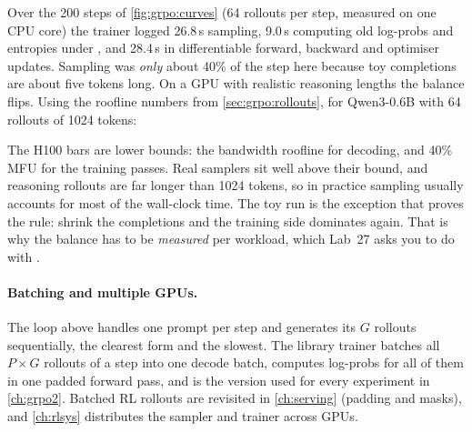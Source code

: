 \begin{systemslens}
Over the 200 steps of \cref{fig:grpo:curves} (64 rollouts per step, measured on one CPU core)
the trainer logged 26.8\,s sampling, 9.0\,s computing old log-probs and entropies under
, and 28.4\,s in differentiable forward, backward and optimiser updates.
Sampling was \emph{only} about 40\% of the step here because toy completions are about five tokens
long. On a GPU with realistic reasoning lengths the balance flips. Using the roofline numbers
from \cref{sec:grpo:rollouts}, for Qwen3-0.6B with 64 rollouts of 1024 tokens:

\smallskip
\centering
{}
\raggedright

\smallskip
The H100 bars are lower bounds: the bandwidth roofline for decoding, and 40\% MFU
for the training passes. Real samplers sit well above their bound, and reasoning
rollouts are far longer than 1024 tokens, so in practice sampling usually accounts for most of
the wall-clock time. The toy run is the exception that proves the rule: shrink the
completions and the training side dominates again. That is why the balance has to be
\emph{measured} per workload, which Lab~27 asks you to do with .
\end{systemslens}

\paragraph{Batching and multiple GPUs.} The loop above handles one prompt per step and
generates its $G$ rollouts sequentially, the clearest form and the slowest. The library trainer
batches all $P\times G$ rollouts of a step into one decode batch, computes log-probs for all
of them in one padded forward pass, and is the version used for every experiment in
\cref{ch:grpo2}. Batched RL rollouts are revisited in \cref{ch:serving} (padding and masks),
and \cref{ch:rlsys} distributes the sampler and trainer across GPUs.

